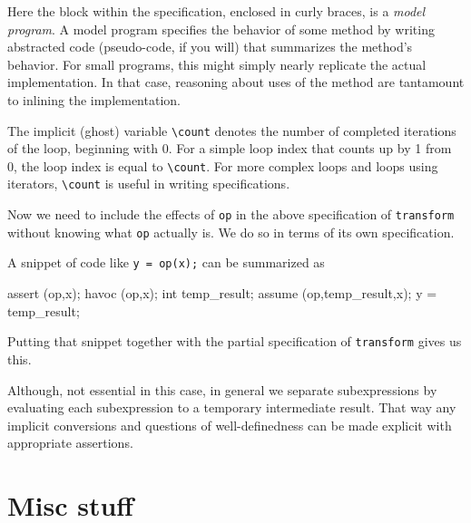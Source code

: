 Here the block within the specification, enclosed in curly braces, is
a \textit{model program}.  A model program specifies the behavior of
some method by writing abstracted code (pseudo-code, if you will) that
summarizes the method's behavior.  For small programs, this might
simply nearly replicate the actual implementation.  In that case,
reasoning about uses of the method are tantamount to inlining the
implementation.

The implicit (ghost) variable \lstinline|\count| denotes the number of completed iterations of the loop, beginning with 0. 
For a simple loop index that counts up by 1 from 0, the loop index is equal to \lstinline|\count|. 
For more complex loops and loops using iterators, 
\lstinline|\count| is useful in writing specifications.

Now we need to include the effects of \lstinline|op| in the above specification of \lstinline|transform| without knowing what \lstinline|op| actually is. We do so in terms of its own specification.

A snippet of code like \lstinline|y = op(x);| can be summarized as
\begin{listing-nonumber}
	assert \pre(op,x);
	havoc \assigns(op,x);
	int temp_result;
	assume \post(op,temp_result,x);
	y = temp_result;
\end{listing-nonumber}

Putting that snippet together with the partial specification of 
\lstinline|transform| gives us this.



Although, not essential in this case, in general we separate subexpressions by evaluating each subexpression to a temporary intermediate result. That way any implicit conversions and questions of well-definedness can be made explicit with appropriate assertions.
\section{Misc stuff}


